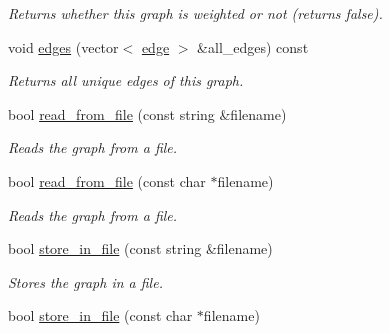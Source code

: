 \begin{DoxyCompactItemize}
\begin{DoxyCompactList}\small\item\em Returns whether this graph is weighted or not (returns false). \end{DoxyCompactList}\item 
void \hyperlink{classlgraph_1_1utils_1_1uxgraph_ade877f3a9cf71d844cfe7b6c4f8aae10}{edges} (vector$<$ \hyperlink{namespacelgraph_1_1utils_a6510284ce1b1ae5dc97ce5d2de426e10}{edge} $>$ \&all\+\_\+edges) const 
\begin{DoxyCompactList}\small\item\em Returns all unique edges of this graph. \end{DoxyCompactList}\item 
bool \hyperlink{classlgraph_1_1utils_1_1uxgraph_a8328003e12383f0ff3f344aa6a239345}{read\+\_\+from\+\_\+file} (const string \&filename)\hypertarget{classlgraph_1_1utils_1_1uxgraph_a8328003e12383f0ff3f344aa6a239345}{}\label{classlgraph_1_1utils_1_1uxgraph_a8328003e12383f0ff3f344aa6a239345}

\begin{DoxyCompactList}\small\item\em Reads the graph from a file. \end{DoxyCompactList}\item 
bool \hyperlink{classlgraph_1_1utils_1_1uxgraph_a3e8b1f79b060234dced303a4171fae92}{read\+\_\+from\+\_\+file} (const char $\ast$filename)\hypertarget{classlgraph_1_1utils_1_1uxgraph_a3e8b1f79b060234dced303a4171fae92}{}\label{classlgraph_1_1utils_1_1uxgraph_a3e8b1f79b060234dced303a4171fae92}

\begin{DoxyCompactList}\small\item\em Reads the graph from a file. \end{DoxyCompactList}\item 
bool \hyperlink{classlgraph_1_1utils_1_1uxgraph_a2aef5492b3c18e0a6a9a2e75e2ff9e04}{store\+\_\+in\+\_\+file} (const string \&filename)\hypertarget{classlgraph_1_1utils_1_1uxgraph_a2aef5492b3c18e0a6a9a2e75e2ff9e04}{}\label{classlgraph_1_1utils_1_1uxgraph_a2aef5492b3c18e0a6a9a2e75e2ff9e04}

\begin{DoxyCompactList}\small\item\em Stores the graph in a file. \end{DoxyCompactList}\item 
bool \hyperlink{classlgraph_1_1utils_1_1uxgraph_a1f54ad58bf346fe85e3c94c118854fc7}{store\+\_\+in\+\_\+file} (const char $\ast$filename)\hypertarget{classlgraph_1_1utils_1_1uxgraph_a1f54ad58bf346fe85e3c94c118854fc7}{}\label{classlgraph_1_1utils_1_1uxgraph_a1f54ad58bf346fe85e3c94c118854fc7}


\end{DoxyCompactItemize}
